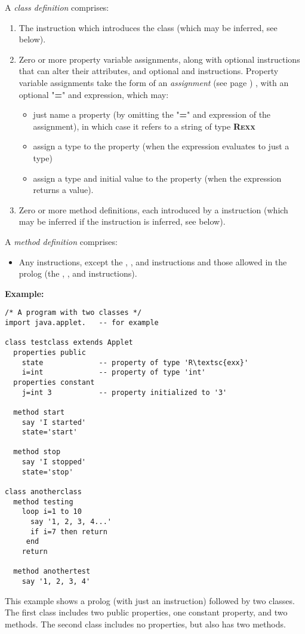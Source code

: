 A \emph{class definition} comprises:
\begin{enumerate}
\item The  instruction which introduces the class (which may
be inferred, see below).
\item 
Zero or more property variable assignments,
along with optional 
instructions that can alter their attributes, and optional
 and  instructions.
Property variable assignments take the form of an
 \emph{assignment} (see page \pageref{refassign}) , with an optional
"\textbf{=}" and expression, which may:
\begin{itemize}
\item just name a property (by omitting the "\textbf{=}"
and expression of the assignment), in which case it refers to a string of
type \textbf{R\textsc{exx}}
\item assign a type to the property (when the expression evaluates to just
a type)
\item 
assign a type and initial value to the property (when the expression
returns a value).
\end{itemize}
\item Zero or more method definitions, each introduced by a
 instruction (which may be inferred if the 
instruction is inferred, see below).
\end{enumerate}
 
A \emph{method definition} comprises:
\begin{itemize}
\item 
Any \nr{} instructions, except the , ,
and  instructions and those allowed in the prolog
(the , , and 
instructions).
\end{itemize}
 \textbf{Example:}
\begin{lstlisting}[label=testclass,caption=testclass.nrx]
/* A program with two classes */
import java.applet.   -- for example

class testclass extends Applet
  properties public
    state             -- property of type 'R\textsc{exx}'
    i=int             -- property of type 'int'
  properties constant
    j=int 3           -- property initialized to '3'

  method start
    say 'I started'
    state='start'

  method stop
    say 'I stopped'
    state='stop'

class anotherclass
  method testing
    loop i=1 to 10
      say '1, 2, 3, 4...'
      if i=7 then return
     end
    return

  method anothertest
    say '1, 2, 3, 4'
\end{lstlisting}
This example shows a prolog (with just an 
instruction) followed by two classes.  The first class includes
two public properties, one constant property, and two methods.
The second class includes no properties, but also has two methods.
 
